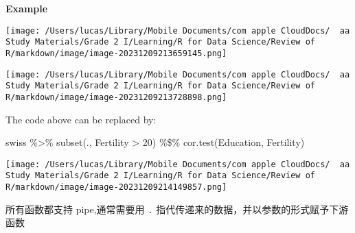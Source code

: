 \documentclass[
]{article}
\let\oldincludegraphics\includegraphics
\renewcommand{\includegraphics}[2][]{\begin{center}\oldincludegraphics[#1]{#2}\end{center}}
\newenvironment{Shaded}{}{}
\newcommand{\DecValTok}[1]{\textcolor[rgb]{0.25,0.63,0.44}{#1}}
\newcommand{\FunctionTok}[1]{\textcolor[rgb]{0.02,0.16,0.49}{#1}}
\newcommand{\NormalTok}[1]{#1}
\newcommand{\OtherTok}[1]{\textcolor[rgb]{0.00,0.44,0.13}{#1}}
\newcommand{\SpecialCharTok}[1]{\textcolor[rgb]{0.25,0.44,0.63}{#1}}
\begin{document}
\textbf{Example}

\begin{Shaded}
\end{Shaded}

\texttt{[image: /Users/lucas/Library/Mobile Documents/com~apple~CloudDocs/~~aa Study Materials/Grade 2 I/Learning/R for Data Science/Review of R/markdown/image/image-20231209213659145.png]}

\texttt{[image: /Users/lucas/Library/Mobile Documents/com~apple~CloudDocs/~~aa Study Materials/Grade 2 I/Learning/R for Data Science/Review of R/markdown/image/image-20231209213728898.png]}

The code above can be replaced by:

\begin{Shaded}
\begin{Highlighting}[]
\NormalTok{swiss }\SpecialCharTok{\%\textgreater{}\%}
  \FunctionTok{subset}\NormalTok{(., Fertility }\SpecialCharTok{\textgreater{}} \DecValTok{20}\NormalTok{) }\SpecialCharTok{\%\$\%}
  \FunctionTok{cor.test}\NormalTok{(Education, Fertility)}
\end{Highlighting}
\end{Shaded}

\texttt{[image: /Users/lucas/Library/Mobile Documents/com~apple~CloudDocs/~~aa Study Materials/Grade 2 I/Learning/R for Data Science/Review of R/markdown/image/image-20231209214149857.png]}

所有函数都支持 pipe,通常需要用 \texttt{.}
指代传递来的数据，并以参数的形式赋予下游函数
\end{document}
